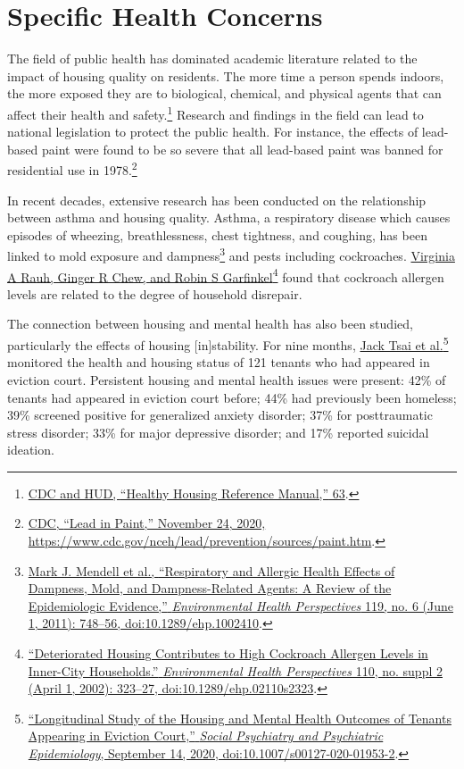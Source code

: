 \documentclass[
  openany]{book}
\begin{document}
\hypertarget{specific-health-concerns}{%
\section{Specific Health Concerns}\label{specific-health-concerns}}

The field of public health has dominated academic literature related to the impact of housing quality on residents. The more time a person spends indoors, the more exposed they are to biological, chemical, and physical agents that can affect their health and safety.\footnote{\protect\hyperlink{ref-cdc2006}{CDC and HUD, {``Healthy Housing Reference Manual,''} 63}.} Research and findings in the field can lead to national legislation to protect the public health. For instance, the effects of lead-based paint were found to be so severe that all lead-based paint was banned for residential use in 1978.\footnote{\protect\hyperlink{ref-cdc2020}{CDC, {``Lead in Paint,''} November 24, 2020, \url{https://www.cdc.gov/nceh/lead/prevention/sources/paint.htm}}.}

In recent decades, extensive research has been conducted on the relationship between asthma and housing quality. Asthma, a respiratory disease which causes episodes of wheezing, breathlessness, chest tightness, and coughing, has been linked to mold exposure and dampness\footnote{\protect\hyperlink{ref-mendell2011}{Mark J. Mendell et al., {``Respiratory and Allergic Health Effects of Dampness, Mold, and Dampness-Related Agents: A Review of the Epidemiologic Evidence,''} \emph{Environmental Health Perspectives} 119, no. 6 (June 1, 2011): 748--56, doi:\href{https://doi.org/10.1289/ehp.1002410}{10.1289/ehp.1002410}}.} and pests including cockroaches. \protect\hyperlink{ref-rauh2002}{Virginia A Rauh, Ginger R Chew, and Robin S Garfinkel}\footnote{\protect\hyperlink{ref-rauh2002}{{``Deteriorated Housing Contributes to High Cockroach Allergen Levels in Inner-City Households.''} \emph{Environmental Health Perspectives} 110, no. suppl 2 (April 1, 2002): 323--27, doi:\href{https://doi.org/10.1289/ehp.02110s2323}{10.1289/ehp.02110s2323}}.} found that cockroach allergen levels are related to the degree of household disrepair.

The connection between housing and mental health has also been studied, particularly the effects of housing {[}in{]}stability. For nine months, \protect\hyperlink{ref-tsai2020}{Jack Tsai et al.}\footnote{\protect\hyperlink{ref-tsai2020}{{``Longitudinal Study of the Housing and Mental Health Outcomes of Tenants Appearing in Eviction Court,''} \emph{Social Psychiatry and Psychiatric Epidemiology}, September 14, 2020, doi:\href{https://doi.org/10.1007/s00127-020-01953-2}{10.1007/s00127-020-01953-2}}.} monitored the health and housing status of 121 tenants who had appeared in eviction court. Persistent housing and mental health issues were present: 42\% of tenants had appeared in eviction court before; 44\% had previously been homeless; 39\% screened positive for generalized anxiety disorder; 37\% for posttraumatic stress disorder; 33\% for major depressive disorder; and 17\% reported suicidal ideation.
\end{document}
